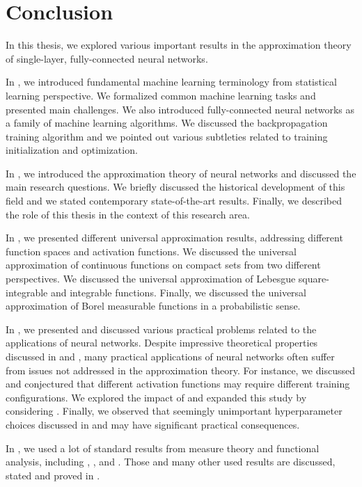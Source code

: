 \chapter{Conclusion}

In this thesis, we explored various important results in the approximation theory of single-layer, fully-connected neural networks.

In , we introduced fundamental machine learning terminology from statistical learning perspective. We formalized common machine learning tasks and presented main challenges. We also introduced fully-connected neural networks as a family of machine learning algorithms. We discussed the backpropagation training algorithm and we pointed out various subtleties related to training initialization and optimization.

In , we introduced the approximation theory of neural networks and discussed the main research questions.
We briefly discussed the historical development of this field and we stated contemporary state-of-the-art results. Finally, we described the role of this thesis in the context of this research area.

In , we presented different universal approximation results, addressing different function spaces and activation functions. We discussed the universal approximation of continuous functions on compact sets from two different perspectives. We discussed the universal approximation of Lebesgue square-integrable and integrable functions. Finally, we discussed the universal approximation of Borel measurable functions in a probabilistic sense.

In , we presented and discussed various practical problems related to the applications of neural networks.
Despite impressive theoretical properties discussed in  and , many practical applications of neural networks often suffer from issues not addressed in the approximation theory. For instance, we discussed  and conjectured that different activation functions may require different training configurations. We explored the impact of  and expanded this study by considering
. Finally, we observed that seemingly unimportant hyperparameter choices discussed in  and  may have significant practical consequences.

In  , we used a lot of standard results from measure theory and functional analysis, including , ,  and . Those and many other used results are discussed, stated and proved in .